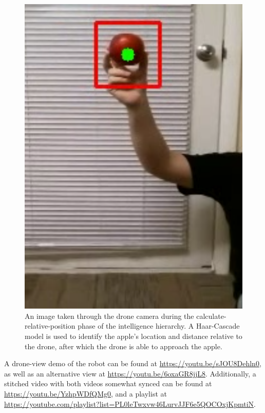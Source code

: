 \begin{figure}[!htb]
    \centering
    \includegraphics[scale=0.5,keepaspectratio]
    {./figures/haar-cascade-detection}
    \caption{
        An image taken through the drone camera during the calculate-relative-position phase of the intelligence hierarchy.
        A Haar-Cascade model is used to identify the apple's location and distance relative to the drone, after which the drone is able to approach the apple.
    }
    \label{fig:drone-haar-cascade}
\end{figure}

A drone-view demo of the robot can be found at \mbox{\url{https://youtu.be/sJOU8Dehln0}}, as well as an alternative view at \mbox{\url{https://youtu.be/6oxaGR8jjL8}}.
Additionally, a stitched video with both videos somewhat synced can be found at \mbox{\url{https://youtu.be/YzhpWDfQMg0}}, and a playlist at \url{https://youtube.com/playlist?list=PL0leTwxvw46LurvJJF6e5QOCOxjKpmtiN}.
